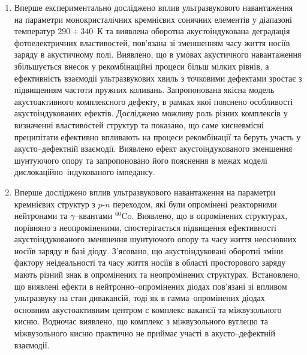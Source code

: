 \begin{enumerate}[leftmargin=0cm,itemindent=3em]
  \item Вперше експериментально досліджено вплив ультразвукового навантаження на параметри монокристалічних кремнієвих сонячних елементів у діапазоні температур $290\div340$~К
  та виявлена оборотна акустоіндукована деградація фотоелектричних властивостей, пов'язана зі зменшенням часу життя носіїв заряду в акустичному полі.
  Виявлено, що в умовах акустичного навантаження збільшується внесок у рекомбінаційні процеси більш мілких рівнів, а ефективність взаємодії ультразвукових хвиль з точковими дефектами зростає з підвищенням частоти пружних коливань.
  Запропонована якісна модель акустоактивного комплексного дефекту, в рамках якої пояснено особливості акустоіндукованих ефектів.
  Досліджено можливу роль різних комплексів у визначенні властивостей структур та показано, що саме кисневмісні преципітати ефективно впливають на процеси рекомбінації та беруть участь у акусто--дефектній взаємодії.
 Виявлено ефект акустоіндукованого зменшення шунтуючого опору та запропоновано його пояснення в межах моделі дислокаційно--індукованого імпедансу.

\item Вперше досліджено вплив ультразвукового навантаження на параметри кремнієвих структур з $p$-$n$ переходом, які були опромінені реакторними нейтронами та $\gamma$--квантами $^{60}$Co.
      Виявлено, що в опромінених структурах, порівняно з неопроміненими, спостерігається підвищення ефективності акустоіндукованого зменшення шунтуючого опору та часу життя неосновних носіїв заряду в базі діоду.
      З'ясовано, що акустоіндуковані оборотні зміни фактору неідеальності та часу життя носіїв в області просторового заряду   мають різний знак в опромінених та неопромінених структурах.
      Встановлено, що виявлені ефекти в нейтронно--опромінених діодах пов'язані зі впливом ультразвуку на стан дивакансій,  тоді як в гамма--опромінених діодах основним акустоактивним центром є комплекс вакансії та міжвузольного кисню.
     Водночас виявлено, що комплекс з міжвузольного вуглецю та міжвузольного кисню практично не приймає участі в акусто--дефектній взаємодії.


\end{enumerate}

